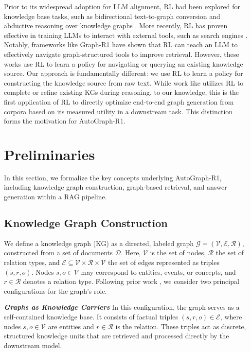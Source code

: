 \documentclass[11pt]{article}
\begin{document}
Prior to its widespread adoption for LLM alignment, RL had been explored for knowledge base tasks, such as bidirectional text-to-graph conversion \citep{dognin_regen_2021} and abductive reasoning over knowledge graphs \citep{bai_advancing_2024}. More recently, RL has proven effective in training LLMs to interact with external tools, such as search engines \citep{jin_search-r1_2025, jiang_s3_2025, li_towards_2025, zhang_web_2025, jiang_deepretrieval_2025}. Notably, frameworks like Graph-R1 \citep{luo_graph-r1_2025} have shown that RL can teach an LLM to effectively navigate graph-structured tools to improve retrieval. 
However, these works use RL to learn a policy for navigating or querying an existing knowledge source. Our approach is fundamentally different: we use RL to learn a policy for constructing the knowledge source from raw text. While work like \citep{zhang_collaborative_2025} utilizes RL to complete or refine existing KGs during reasoning, to our knowledge, this is the first application of RL to directly optimize end-to-end graph generation from corpora based on its measured utility in a downstream task. This distinction forms the motivation for AutoGraph-R1.

\section{Preliminaries}
\label{sec:preliminaries}

In this section, we formalize the key concepts underlying AutoGraph-R1, including knowledge graph construction, graph-based retrieval, and answer generation within a RAG pipeline.

\subsection{Knowledge Graph Construction}
We define a knowledge graph (KG) as a directed, labeled graph $\mathcal{G} = (\mathcal{V}, \mathcal{E}, \mathcal{R})$, constructed from a set of documents $\mathcal{D}$. Here, $\mathcal{V}$ is the set of nodes, $\mathcal{R}$ the set of relation types, and $\mathcal{E} \subseteq \mathcal{V} \times \mathcal{R} \times \mathcal{V}$ the set of edges represented as triples $(s, r, o)$. Nodes $s,o \in \mathcal{V}$ may correspond to entities, events, or concepts, and $r \in \mathcal{R}$ denotes a relation type. Following prior work \citep{zhang_survey_2025}, we consider two principal configurations for the graph's role.

\textit{\textbf{Graphs as Knowledge Carriers}} In this configuration, the graph serves as a self-contained knowledge base. It consists of factual triples $(s, r, o) \in \mathcal{E}$, where nodes $s, o \in \mathcal{V}$ are entities and $r \in \mathcal{R}$ is the relation. These triples act as discrete, structured knowledge units that are retrieved and processed directly by the downstream model.
\end{document}
